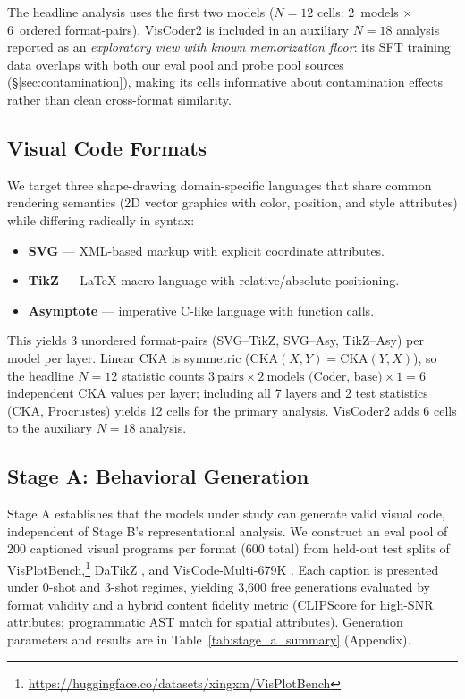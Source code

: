 The headline analysis uses the first two models ($N{=}12$ cells: 2~models $\times$ 6~ordered format-pairs).
VisCoder2 is included in an auxiliary $N{=}18$ analysis reported as an \emph{exploratory view with known memorization floor}: its SFT training data overlaps with both our eval pool and probe pool sources (\S\ref{sec:contamination}), making its cells informative about contamination effects rather than clean cross-format similarity.

\subsection{Visual Code Formats}

We target three shape-drawing domain-specific languages that share common rendering semantics (2D vector graphics with color, position, and style attributes) while differing radically in syntax:

\begin{itemize}
    \item \textbf{SVG} --- XML-based markup with explicit coordinate attributes.
    \item \textbf{TikZ} --- \LaTeX{} macro language with relative/absolute positioning.
    \item \textbf{Asymptote} --- imperative C-like language with function calls.
\end{itemize}

This yields 3 unordered format-pairs (SVG--TikZ, SVG--Asy, TikZ--Asy) per model per layer.
Linear CKA is symmetric ($\text{CKA}(X,Y) = \text{CKA}(Y,X)$), so the headline $N{=}12$ statistic counts $3~\text{pairs} \times 2~\text{models (Coder, base)} \times 1 = 6$ independent CKA values per layer; including all 7 layers and 2 test statistics (CKA, Procrustes) yields 12 cells for the primary analysis.
VisCoder2 adds 6 cells to the auxiliary $N{=}18$ analysis.

\subsection{Stage A: Behavioral Generation}
\label{sec:stage-a}

Stage A establishes that the models under study can generate valid visual code, independent of Stage B's representational analysis.
We construct an eval pool of 200 captioned visual programs per format (600 total) from held-out test splits of VisPlotBench,\footnote{\url{https://huggingface.co/datasets/xingxm/VisPlotBench}} DaTikZ \cite{datikz}, and VisCode-Multi-679K \cite{viscoder2}.
Each caption is presented under 0-shot and 3-shot regimes, yielding 3{,}600 free generations evaluated by format validity and a hybrid content fidelity metric (CLIPScore \cite{clip} for high-SNR attributes; programmatic AST match for spatial attributes).
Generation parameters and results are in Table~\ref{tab:stage_a_summary} (Appendix).

